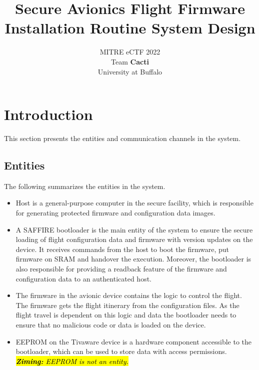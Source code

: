 \documentclass[11pt,oneside,onecolumn,letterpaper]{article}
\title{Secure Avionics Flight Firmware Installation Routine System Design}
\author{MITRE eCTF 2022\\Team \textbf{Cacti}\\ University at Buffalo}
\date{}
\newcommand{\ziming}[1]{%
  \begingroup
  \definecolor{hlcolor}{RGB}{20, 255, 20}\sethlcolor{hlcolor}%
  \textcolor{black}{\hl{\textit{\textbf{Ziming:} #1}}}%
  \endgroup
}
\begin{document}
\normalsize


\maketitle

\renewcommand{\thepage}{System Design, Team Cacti, University at Buffalo--\arabic{page}}
\setcounter{page}{1} \normalsize
%

\newcommand{\flagRollback}{\textsf{Rollback}\xspace}

\section{Introduction}

This section presents the entities and communication channels in the system.

\subsection{Entities}

The following summarizes the entities in the system.

\begin{itemize}
  \item Host is a general-purpose computer in the secure facility, which is responsible for generating protected firmware and configuration data images.
	\item A SAFFIRE bootloader is the main entity of the system to ensure the secure loading of flight configuration data and firmware with version updates on the device.
	It receives commands from the host to boot the firmware, put firmware on SRAM and handover the execution. 
	Moreover, the bootloader is also responsible for providing a readback feature of the firmware and configuration data to an authenticated host.
	\item The firmware in the avionic device contains the logic to control the flight. 
	The firmware gets the flight itinerary from the configuration files.
	As the flight travel is dependent on this logic and data the bootloader needs to ensure that no malicious code or data is loaded on the device.
  \item  EEPROM on the Tivaware device is a hardware component accessible to the bootloader, which can be used to store data with access permissions. \ziming{EEPROM is not an entity.}
\end{itemize}
\end{document}

